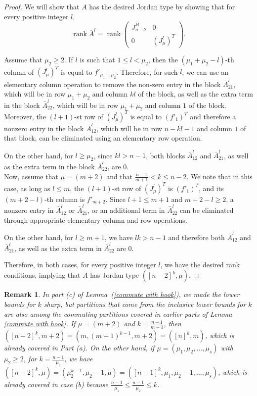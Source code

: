 \documentclass[11pt]{amsproc}
\newtheorem{rem}[thm]{Remark}
\DeclareMathOperator{\rank}{rank}
\begin{document}
\begin{proof}
We will show that $A$ has the desired Jordan type by showing that for every positive integer $l$, 
\[\rank\bar{A}^l=\rank \left( 
\begin{array}{c|c}
  J_{n-2}^{kl} & 0 \\
 \hline
  0& \left(J^l_\mu\right)^T
\end{array}
\right).\]

 Assume that $\mu_2\geq 2$. If $l$ is such that $1\leq l <\mu_2$, then the $(\mu_1+\mu_2-l)$-th column of $\left(J^l_\mu\right)^T$ is equal to $f'_{\mu_1+\mu_2}$. Therefore, for such $l$, we can use an elementary column operation to remove the non-zero entry in the block $\bar{A}^l_{21}$, which will be in row $\mu_1+\mu_2$ and column $kl$ of the block, as well as the extra term in the block $\bar{A}^l_{22}$, which will be in row $\mu_1+\mu_2$ and column $1$ of the block. Moreover, the $(l+1)$-st row of $\left(J^l_\mu\right)^T$ is equal to $(f'_1)^T$ and therefore a nonzero entry in the block $\bar{A}^l_{12}$, which will be in row $n-kl-1$ and column $1$ of that block, can be eliminated using an elementary row operation. 

On the other hand, for $l\geq \mu_2$, since $kl> n-1$, both blocks $\bar{A}^l_{12}$ and $\bar{A}^l_{21}$, as well as the extra term in the block $\bar{A}^l_{22}$, are 0.
\\

 Now, assume that $\mu=(m+2)$ and that $\frac{n-1}{m+1}< k \leq n-2$. We note that in this case, as long as $l\leq m$, the $(l+1)$-st row of $\left(J^l_\mu\right)^T$ is $(f'_1)^T$, and its $(m+2-l)$-th column is $f'_{m+2}$. Since $l+1\leq m+1$ and $m+2-l\geq 2$, a nonzero entry in $\bar{A}^l_{12}$ or $\bar{A}^l_{21}$, or an additional term in $\bar{A}^l_{22}$ can be eliminated through appropriate elementary column and row operations.

On the other hand, for $l\geq m+1$, we have $lk> n-1$ and therefore both $\bar{A}^l_{12}$ and $\bar{A}^l_{21}$, as well as the extra term in $\bar{A}^l_{22}$ are 0.

Therefore, in both cases, for every positive integer $l$, we have the desired rank conditions, implying that $A$ has Jordan type $([n-2]^k, \mu)$.
\end{proof}

\begin{rem}
In part (c) of Lemma~(\ref{commute with hook}), we made the lower bounds for $k$ sharp, but partitions that come from the inclusive lower bounds for $k$ are also among the commuting partitions covered in earlier parts of Lemma \ref{commute with hook}. If $\mu=(m+2)$ and $k=\frac{n-1}{m+1}$, then $([n-2]^k, m+2)=(m,(m+1)^{k-1},m+2)=([n]^k, m)$, which is already covered in Part (a). On the other hand, if $\mu=(\mu_1, \mu_2, \ldots, \mu_s)$ with $\mu_2\geq 2$, for $k=\frac{n-1}{\mu_2}$, we have $([n-2]^k, \mu)=(\mu_2^{k-1}, \mu_2-1, \mu)=([n-1]^k, \mu_1,\mu_2-1, \ldots, \mu_s)$, which is already covered in case (b) because $\frac{n-1}{\mu_1}\leq \frac{n-1}{\mu_2}\leq k$.
\end{rem}
\end{document}
